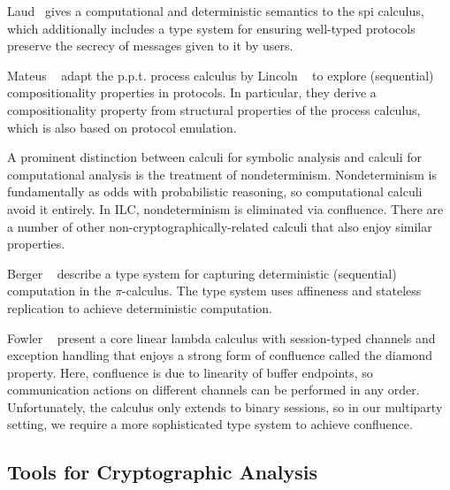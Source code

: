 Laud~\cite{laud2005secrecy} gives a computational and deterministic semantics to
the spi calculus, which additionally includes a type system for ensuring
well-typed protocols preserve the secrecy of messages given to it by users.

Mateus \etal~\cite{mateus2003composition} adapt the p.p.t. process calculus by
Lincoln \etal~\cite{lincoln1998probabilistic} to explore (sequential)
compositionality properties in protocols. In particular, they derive a
compositionality property from structural properties of the process calculus,
which is also based on protocol emulation.


A prominent distinction between calculi for symbolic analysis and calculi for
computational analysis is the treatment of nondeterminism. Nondeterminism is
fundamentally as odds with probabilistic reasoning, so computational calculi
avoid it entirely. In ILC, nondeterminism is eliminated via confluence. There
are a number of other non-cryptographically-related calculi that also enjoy
similar properties.

Berger \etal~\cite{berger2001sequentiality} describe a type system for capturing
deterministic (sequential) computation in the $\pi$-calculus. The type system uses
affineness and stateless replication to achieve deterministic computation.

Fowler \etal~\cite{fowler2018session} present a core linear lambda calculus with
session-typed channels and exception handling that enjoys a strong form of
confluence called the diamond property. Here, confluence is due to linearity of
buffer endpoints, so communication actions on different channels can be
performed in any order. Unfortunately, the calculus only extends to binary
sessions, so in our multiparty setting, we require a more sophisticated type
system to achieve confluence.

\subsection{Tools for Cryptographic Analysis}
\label{subsec:tools}

